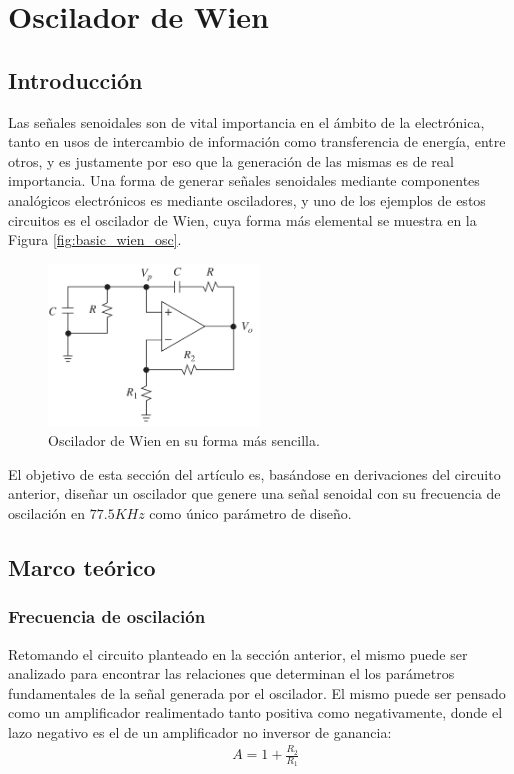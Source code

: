 \section{Oscilador de Wien}
\subsection{Introducción}
Las señales senoidales son de vital importancia en el ámbito de la electrónica, tanto en usos de intercambio de información como transferencia de energía, entre otros, y 
es justamente por eso que la generación de las mismas es de real importancia.
Una forma de generar señales senoidales mediante componentes analógicos electrónicos es mediante osciladores, y uno de los ejemplos de estos circuitos es el oscilador de 
Wien, cuya forma más elemental se muestra en la Figura \ref{fig:basic_wien_osc}.
\begin{figure}[H]
    \centering
    \includegraphics[width=0.5\textwidth]{../EJ1/Recursos/basic_wien_osc.png}
    \caption{Oscilador de Wien en su forma más sencilla.}
    \label{fig:basic_wien_osc_ex1}
\end{figure}
El objetivo de esta sección del artículo es, basándose en derivaciones del circuito anterior, diseñar un oscilador que genere una señal senoidal con su frecuencia de 
oscilación en $77.5KHz$ como único parámetro de diseño.



\subsection{Marco teórico}
\subsubsection{Frecuencia de oscilación}
Retomando el circuito planteado en la sección anterior, el mismo puede ser analizado para encontrar las relaciones que determinan el los parámetros fundamentales de la 
señal generada por el oscilador.
El mismo puede ser pensado como un amplificador realimentado tanto positiva como negativamente, donde el lazo negativo es el de un amplificador no inversor de ganancia:
\begin{align} 
    & A = 1 + \frac{R_2}{R_1}
    \label{eq:neg_loop_gain_ex1}
\end{align}

